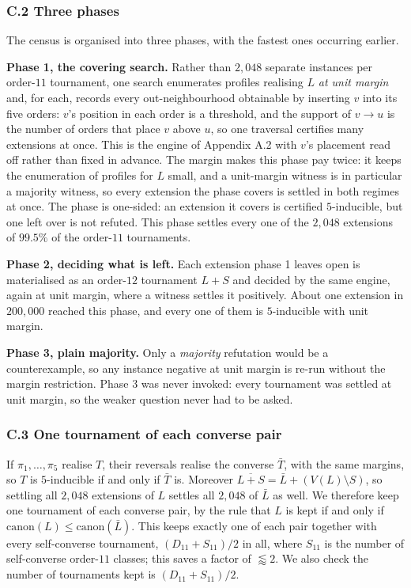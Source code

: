 \documentclass[
]{article}
\begin{document}
\subsubsection{C.2 Three phases}\label{c.2-three-phases}

The census is organised into three phases, with the fastest ones
occurring earlier.

\textbf{Phase 1, the covering search.} Rather than \(2{,}048\) separate
instances per order-\(11\) tournament, one search enumerates profiles
realising \(L\) \emph{at unit margin} and, for each, records every
out-neighbourhood obtainable by inserting \(v\) into its five orders:
\(v\)'s position in each order is a threshold, and the support of
\(v \to u\) is the number of orders that place \(v\) above \(u\), so one
traversal certifies many extensions at once. This is the engine of
Appendix A.2 with \(v\)'s placement read off rather than fixed in
advance. The margin makes this phase pay twice: it keeps the enumeration
of profiles for \(L\) small, and a unit-margin witness is in particular
a majority witness, so every extension the phase covers is settled in
both regimes at once. The phase is one-sided: an extension it covers is
certified \(5\)-inducible, but one left over is not refuted. This phase
settles every one of the \(2{,}048\) extensions of \(99.5\%\) of the
order-\(11\) tournaments.

\textbf{Phase 2, deciding what is left.} Each extension phase 1 leaves
open is materialised as an order-\(12\) tournament \(L + S\) and decided
by the same engine, again at unit margin, where a witness settles it
positively. About one extension in \(200{,}000\) reached this phase, and
every one of them is \(5\)-inducible with unit margin.

\textbf{Phase 3, plain majority.} Only a \emph{majority} refutation
would be a counterexample, so any instance negative at unit margin is
re-run without the margin restriction. Phase 3 was never invoked: every
tournament was settled at unit margin, so the weaker question never had
to be asked.

\subsubsection{C.3 One tournament of each converse
pair}\label{c.3-one-tournament-of-each-converse-pair}

If \(\pi_1, \dots, \pi_5\) realise \(T\), their reversals realise the
converse \(\bar{T}\), with the same margins, so \(T\) is \(5\)-inducible
if and only if \(\bar{T}\) is. Moreover
\(\overline{L + S} = \bar{L} + (V(L) \setminus S)\), so settling all
\(2{,}048\) extensions of \(L\) settles all \(2{,}048\) of \(\bar{L}\)
as well. We therefore keep one tournament of each converse pair, by the
rule that \(L\) is kept if and only if
\(\mathrm{canon}(L) \le \mathrm{canon}(\bar{L})\). This keeps exactly
one of each pair together with every self-converse tournament,
\((D_{11} + S_{11})/2\) in all, where \(S_{11}\) is the number of
self-converse order-\(11\) classes; this saves a factor of
\(\lessapprox 2\). We also check the number of tournaments kept is
\((D_{11} + S_{11})/2\).
\end{document}
